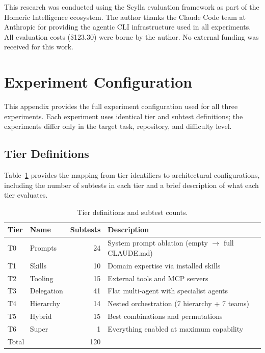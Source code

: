 \documentclass[11pt]{article}
\begin{document}
This research was conducted using the Scylla evaluation framework as part of
the Homeric Intelligence ecosystem. The author thanks the Claude Code team at
Anthropic for providing the agentic CLI infrastructure used in all experiments.
All evaluation costs (\$123.30) were borne by the author. No external funding
was received for this work.




\appendix

\section{Experiment Configuration}
\label{app:experiment_config}

This appendix provides the full experiment configuration used for all three
experiments. Each experiment uses identical tier and subtest definitions; the
experiments differ only in the target task, repository, and difficulty level.

\subsection{Tier Definitions}

Table~\ref{tab:tier_defs} provides the mapping from tier identifiers to
architectural configurations, including the number of subtests in each tier
and a brief description of what each tier evaluates.

\begin{table}[htbp]
  \centering
  \caption{Tier definitions and subtest counts.}
  \label{tab:tier_defs}
  \small
  \begin{tabular}{llrl}
    \toprule
    Tier & Name & Subtests & Description \\
    \midrule
    T0 & Prompts    & 24 & System prompt ablation (empty $\to$ full CLAUDE.md) \\
    T1 & Skills     & 10 & Domain expertise via installed skills \\
    T2 & Tooling    & 15 & External tools and MCP servers \\
    T3 & Delegation & 41 & Flat multi-agent with specialist agents \\
    T4 & Hierarchy  & 14 & Nested orchestration (7 hierarchy + 7 teams) \\
    T5 & Hybrid     & 15 & Best combinations and permutations \\
    T6 & Super      &  1 & Everything enabled at maximum capability \\
    \midrule
    \multicolumn{2}{l}{Total} & 120 & \\
    \bottomrule
  \end{tabular}
\end{table}
\end{document}
